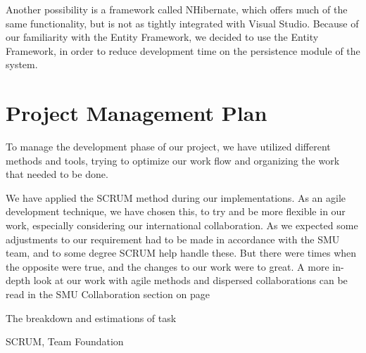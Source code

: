 Another possibility is a framework called NHibernate, which offers much of the same functionality, but is not as tightly integrated with Visual Studio. Because of our familiarity with the Entity Framework, we decided to use the Entity Framework, in order to reduce development time on the persistence module of the system.

\section{Project Management Plan}
To manage the development phase of our project, we have utilized different methods and tools, trying to optimize our work flow and organizing the work that needed to be done. \

We have applied the SCRUM method during our implementations. As an agile development technique, we have chosen this, to try and be more flexible in our work, especially considering our international collaboration. As we expected some adjustments to our requirement had to be made in accordance with the SMU team, and to some degree SCRUM help handle these. But there were times when the opposite were true, and the changes to our work were to great. A more in-depth look at our work with agile methods and dispersed collaborations can be read in the SMU Collaboration section on page \pageref{SMU Collaboration}

The breakdown and estimations of task



SCRUM, Team Foundation
